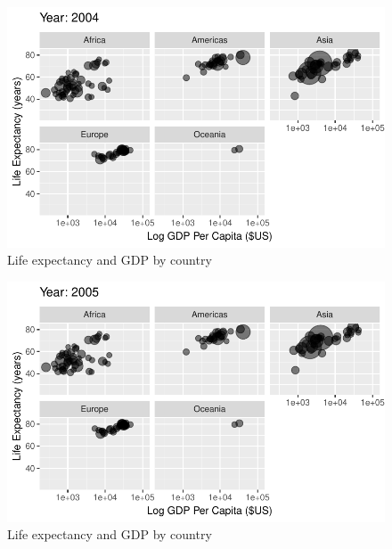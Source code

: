 \documentclass[
  letterpaper,
  DIV=11,
  numbers=noendperiod]{scrreport}
\theoremstyle{definition}
\theoremstyle{remark}
\begin{document}
\begin{figure}

{\centering \includegraphics{index_files/figure-pdf/fig-anim-lifegdp-95.pdf}

}

\caption{\label{fig-anim-lifegdp-95}Life expectancy and GDP by country}

\end{figure}

\begin{figure}

{\centering \includegraphics{index_files/figure-pdf/fig-anim-lifegdp-96.pdf}

}

\caption{\label{fig-anim-lifegdp-96}Life expectancy and GDP by country}

\end{figure}
\end{document}

